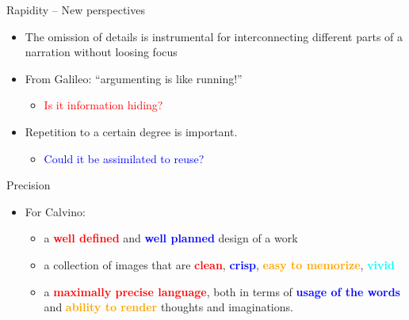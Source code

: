 \documentclass{beamer}
\begin{document}
\begin{frame}
{\centerline{Rapidity -- New perspectives}}

\begin{itemize}
\item The omission of details is instrumental for interconnecting different parts of a narration without loosing focus \vspace{0.2cm}
\item From Galileo: ``argumenting is like running!''
\begin{itemize}
\item \textcolor{red}{Is it information hiding?} \vspace{0.2cm}
\end{itemize}
\item Repetition to a certain degree is important. 
\begin{itemize}
\item \textcolor{blue}{Could it be assimilated to reuse?}
\end{itemize}

\end{itemize}

\end{frame}

\begin{frame}
{\centerline{Precision}}
\begin{itemize}
\item For Calvino: \vspace{0.3cm}
\begin{itemize}
\item a \textcolor{red}{\textbf{well defined}}  and \textcolor{blue}{\textbf{well planned}} design of a work \vspace{0.3cm}

\item a collection of images that are \textcolor{red}{\textbf{clean}}, \textcolor{blue}{\textbf{crisp}}, \textcolor{orange}{\textbf{easy to memorize}}, \textcolor{cyan}{\textbf{vivid}} \vspace{0.3cm}

\item a \textcolor{red}{\textbf{maximally precise language}}, both in terms of \textcolor{blue}{\textbf{usage of the words}} and  \textcolor{orange}{\textbf{ability to render}}  thoughts and imaginations.
\end{itemize}
\end{itemize}

\end{frame}
\end{document}
